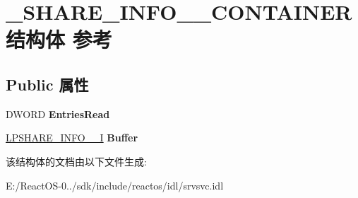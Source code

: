 \hypertarget{struct___s_h_a_r_e___i_n_f_o__502___c_o_n_t_a_i_n_e_r}{}\section{\+\_\+\+S\+H\+A\+R\+E\+\_\+\+I\+N\+F\+O\+\_\+\_\+\+C\+O\+N\+T\+A\+I\+N\+E\+R结构体 参考}
\label{struct___s_h_a_r_e___i_n_f_o__502___c_o_n_t_a_i_n_e_r}
\subsection*{Public 属性}
\begin{DoxyCompactItemize}
\item 
\mbox{\label{struct___s_h_a_r_e___i_n_f_o__502___c_o_n_t_a_i_n_e_r_adcf63c1c627ecbd341cd5b0cfd866733}} 
D\+W\+O\+RD {\bfseries Entries\+Read}
\item 
\mbox{\label{struct___s_h_a_r_e___i_n_f_o__502___c_o_n_t_a_i_n_e_r_a1e00fdef1bb8bdd78da8c8f809ee63c5}} 
\hyperlink{struct___s_h_a_r_e___i_n_f_o__502___i}{L\+P\+S\+H\+A\+R\+E\+\_\+\+I\+N\+F\+O\+\_\+\_\+I} {\bfseries Buffer}
\end{DoxyCompactItemize}


该结构体的文档由以下文件生成\+:\begin{DoxyCompactItemize}
\item 
E\+:/\+React\+O\+S-\/0../sdk/include/reactos/idl/srvsvc.\+idl\end{DoxyCompactItemize}
